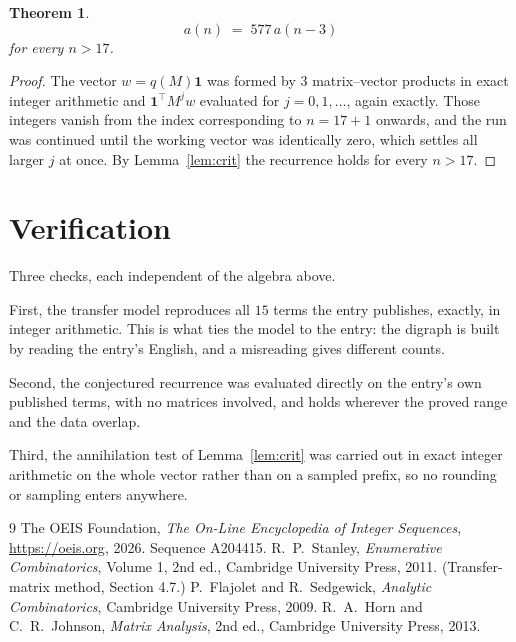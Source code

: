 \documentclass[11pt,a4paper]{article}
\theoremstyle{plain}
\newtheorem{theorem}{Theorem}
\theoremstyle{definition}
\begin{document}
\begin{theorem}
\[
a(n)\;=\;577\,a(n-3)
\]
for every $n>17$.
\end{theorem}

\begin{proof}
The vector $w=q(M)\mathbf{1}$ was formed by $3$ matrix--vector products in exact
integer arithmetic and $\mathbf{1}^{\!\top}M^{j}w$ evaluated for $j=0,1,\dots$, again
exactly. Those integers vanish from the index corresponding to $n=17+1$ onwards, and the
run was continued until the working vector was identically zero, which settles all larger $j$
at once. By Lemma~\ref{lem:crit} the recurrence holds for every $n>17$.
\end{proof}

\section{Verification}

Three checks, each independent of the algebra above.

First, the transfer model reproduces all $15$ terms the entry publishes, exactly, in
integer arithmetic. This is what ties the model to the entry: the digraph is built by reading
the entry's English, and a misreading gives different counts.

Second, the conjectured recurrence was evaluated directly on the entry's own published terms,
with no matrices involved, and holds wherever the proved range and the data overlap.

Third, the annihilation test of Lemma~\ref{lem:crit} was carried out in exact integer
arithmetic on the whole vector rather than on a sampled prefix, so no rounding or sampling
enters anywhere.

\begin{thebibliography}{9}
 The OEIS Foundation, \emph{The On-Line Encyclopedia of Integer
Sequences}, \url{https://oeis.org}, 2026. Sequence A204415.
 R.~P.~Stanley, \emph{Enumerative Combinatorics}, Volume 1, 2nd ed.,
Cambridge University Press, 2011. (Transfer-matrix method, Section 4.7.)
 P.~Flajolet and R.~Sedgewick, \emph{Analytic Combinatorics}, Cambridge
University Press, 2009.
 R.~A.~Horn and C.~R.~Johnson, \emph{Matrix Analysis}, 2nd ed., Cambridge
University Press, 2013.
\end{thebibliography}
\end{document}
